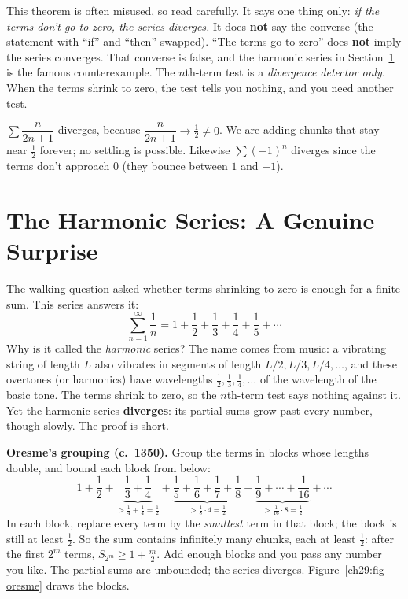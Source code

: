 \begin{trapbox}
This theorem is often misused, so read carefully. It says one thing only: \emph{if the terms don't go to zero, the series diverges.} It does \textbf{not} say the converse (the statement with ``if'' and ``then'' swapped). ``The terms go to zero'' does \textbf{not} imply the series converges. That converse is false, and the harmonic series in Section~\ref{ch29:harmonic} is the famous counterexample. The $n$th-term test is a \emph{divergence detector only}. When the terms shrink to zero, the test tells you nothing, and you need another test.
\end{trapbox}

\begin{example}
$\sum \dfrac{n}{2n+1}$ diverges, because $\dfrac{n}{2n+1}\to \tfrac12 \neq 0$. We are adding chunks that stay near $\tfrac12$ forever; no settling is possible. Likewise $\sum (-1)^n$ diverges since the terms don't approach $0$ (they bounce between $1$ and $-1$).
\end{example}

\section{The Harmonic Series: A Genuine Surprise}
\label{ch29:harmonic}

The walking question asked whether terms shrinking to zero is enough for a finite sum. This series answers it:
\[
\sum_{n=1}^{\infty} \frac{1}{n} = 1 + \frac{1}{2} + \frac{1}{3} + \frac{1}{4} + \frac{1}{5} + \cdots
\]
Why is it called the \emph{harmonic} series? The name comes from music: a vibrating string of length $L$ also vibrates in segments of length $L/2, L/3, L/4, \dots$, and these overtones (or harmonics) have wavelengths $\tfrac12, \tfrac13, \tfrac14, \dots$ of the wavelength of the basic tone. The terms shrink to zero, so the $n$th-term test says nothing against it. Yet the harmonic series \textbf{diverges}: its partial sums grow past every number, though slowly. The proof is short.

\begin{focusbox}
\textbf{Oresme's grouping (c.~1350).} Group the terms in blocks whose lengths double, and bound each block from below:
\[
1 + \frac12 + \underbrace{\frac13 + \frac14}_{> \frac14 + \frac14 = \frac12} + \underbrace{\frac15 + \frac16 + \frac17 + \frac18}_{> \frac18\cdot 4 = \frac12} + \underbrace{\frac19 + \cdots + \frac1{16}}_{> \frac{1}{16}\cdot 8 = \frac12} + \cdots
\]
In each block, replace every term by the \emph{smallest} term in that block; the block is still at least $\tfrac12$. So the sum contains infinitely many chunks, each at least $\tfrac12$: after the first $2^m$ terms, $S_{2^m} \ge 1 + \tfrac{m}{2}$. Add enough blocks and you pass any number you like. The partial sums are unbounded; the series diverges. Figure~\ref{ch29:fig-oresme} draws the blocks.
\end{focusbox}

